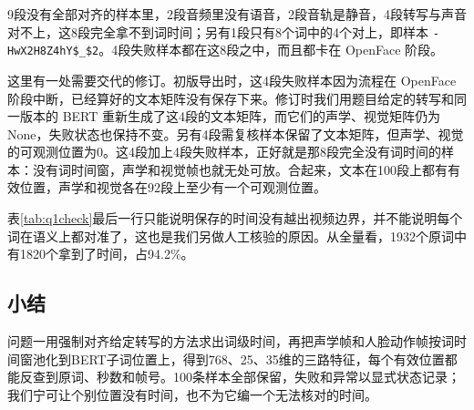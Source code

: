 9段没有全部对齐的样本里，2段音频里没有语音，2段音轨是静音，4段转写与声音对不上，这8段完全拿不到词时间；另有1段只有8个词中的4个对上，即样本 \texttt{-HwX2H8Z4hY\$\_\$2}。4段失败样本都在这8段之中，而且都卡在 OpenFace 阶段。

这里有一处需要交代的修订。初版导出时，这4段失败样本因为流程在 OpenFace 阶段中断，已经算好的文本矩阵没有保存下来。修订时我们用题目给定的转写和同一版本的 BERT 重新生成了这4段的文本矩阵，而它们的声学、视觉矩阵仍为 None，失败状态也保持不变。另有4段需复核样本保留了文本矩阵，但声学、视觉的可观测位置为0。这4段加上4段失败样本，正好就是那8段完全没有词时间的样本：没有词时间窗，声学和视觉帧也就无处可放。合起来，文本在100段上都有有效位置，声学和视觉各在92段上至少有一个可观测位置。

表\ref{tab:q1check}最后一行只能说明保存的时间没有越出视频边界，并不能说明每个词在语义上都对准了，这也是我们另做人工核验的原因。从全量看，1932个原词中有1820个拿到了时间，占94.2\%。

\subsection{小结}

问题一用强制对齐给定转写的方法求出词级时间，再把声学帧和人脸动作帧按词时间窗池化到BERT子词位置上，得到768、25、35维的三路特征，每个有效位置都能反查到原词、秒数和帧号。100条样本全部保留，失败和异常以显式状态记录；我们宁可让个别位置没有时间，也不为它编一个无法核对的时间。
